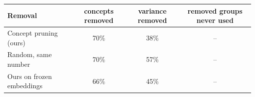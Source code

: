 \begin{tabular}{lccc}
\toprule
Removal & concepts removed & variance removed & removed groups never used \\
\midrule
Concept pruning (ours) & 70\% & 38\% & -- \\
Random, same number & 70\% & 57\% & -- \\
Ours on frozen embeddings & 66\% & 45\% & -- \\
\bottomrule
\end{tabular}
